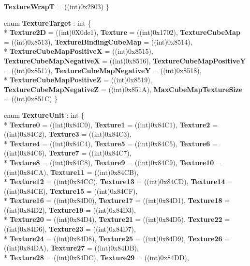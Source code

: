 \begin{DoxyCompactItemize}
{\bfseries Texture\-Wrap\-T} = ((int)0x2803)
 \}
\item 
enum {\bfseries Texture\-Target} \-: int \{ \\*
{\bfseries Texture2\-D} = ((int)0\-X0de1), 
{\bfseries Texture} = ((int)0x1702), 
{\bfseries Texture\-Cube\-Map} = ((int)0x8513), 
{\bfseries Texture\-Binding\-Cube\-Map} = ((int)0x8514), 
\\*
{\bfseries Texture\-Cube\-Map\-Positive\-X} = ((int)0x8515), 
{\bfseries Texture\-Cube\-Map\-Negative\-X} = ((int)0x8516), 
{\bfseries Texture\-Cube\-Map\-Positive\-Y} = ((int)0x8517), 
{\bfseries Texture\-Cube\-Map\-Negative\-Y} = ((int)0x8518), 
\\*
{\bfseries Texture\-Cube\-Map\-Positive\-Z} = ((int)0x8519), 
{\bfseries Texture\-Cube\-Map\-Negative\-Z} = ((int)0x851\-A), 
{\bfseries Max\-Cube\-Map\-Texture\-Size} = ((int)0x851\-C)
 \}
\item 
enum {\bfseries Texture\-Unit} \-: int \{ \\*
{\bfseries Texture0} = ((int)0x84\-C0), 
{\bfseries Texture1} = ((int)0x84\-C1), 
{\bfseries Texture2} = ((int)0x84\-C2), 
{\bfseries Texture3} = ((int)0x84\-C3), 
\\*
{\bfseries Texture4} = ((int)0x84\-C4), 
{\bfseries Texture5} = ((int)0x84\-C5), 
{\bfseries Texture6} = ((int)0x84\-C6), 
{\bfseries Texture7} = ((int)0x84\-C7), 
\\*
{\bfseries Texture8} = ((int)0x84\-C8), 
{\bfseries Texture9} = ((int)0x84\-C9), 
{\bfseries Texture10} = ((int)0x84\-C\-A), 
{\bfseries Texture11} = ((int)0x84\-C\-B), 
\\*
{\bfseries Texture12} = ((int)0x84\-C\-C), 
{\bfseries Texture13} = ((int)0x84\-C\-D), 
{\bfseries Texture14} = ((int)0x84\-C\-E), 
{\bfseries Texture15} = ((int)0x84\-C\-F), 
\\*
{\bfseries Texture16} = ((int)0x84\-D0), 
{\bfseries Texture17} = ((int)0x84\-D1), 
{\bfseries Texture18} = ((int)0x84\-D2), 
{\bfseries Texture19} = ((int)0x84\-D3), 
\\*
{\bfseries Texture20} = ((int)0x84\-D4), 
{\bfseries Texture21} = ((int)0x84\-D5), 
{\bfseries Texture22} = ((int)0x84\-D6), 
{\bfseries Texture23} = ((int)0x84\-D7), 
\\*
{\bfseries Texture24} = ((int)0x84\-D8), 
{\bfseries Texture25} = ((int)0x84\-D9), 
{\bfseries Texture26} = ((int)0x84\-D\-A), 
{\bfseries Texture27} = ((int)0x84\-D\-B), 
\\*
{\bfseries Texture28} = ((int)0x84\-D\-C), 
{\bfseries Texture29} = ((int)0x84\-D\-D), 

\end{DoxyCompactItemize}

